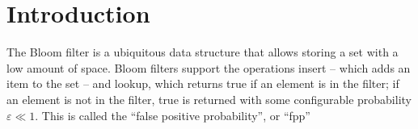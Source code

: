 \documentclass[sigconf]{acmart}
\begin{document}



\section{Introduction}






The Bloom filter is a ubiquitous data structure that allows storing a set with a low amount of space.
Bloom filters support the operations insert -- which adds an item to the set -- and lookup, which returns true if an element is in the filter; if an element is not in the filter, true is returned with some configurable probability $\varepsilon \ll 1$.
This is called the ``false positive probability'', or ``fpp''
\end{document}
